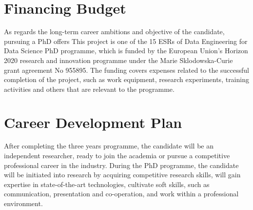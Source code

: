 \documentclass[12pt]{article}
\begin{document}
\section{Financing Budget}
As regards the long-term career ambitions and objective of the candidate, pursuing a PhD offers 
This project is one of the 15 ESRs of Data Engineering for Data Science PhD programme, which is funded by the European Union's Horizon 2020 research and innovation programme under the Marie Sklodowska-Curie grant agreement No 955895. The funding covers expenses related to the successful completion of the project, such as work equipment, research experiments, training activities and others
that are relevant to the programme.



\section{Career Development Plan}
After completing the three years 
programme, the candidate will be an independent researcher, ready to join the academia or pursue a competitive professional career in the industry. 
During the PhD programme, the candidate will be initiated 
into research by acquiring competitive research skills, will gain expertise in state-of-the-art technologies, 
cultivate soft skills, such as communication, presentation and co-operation, and work within a professional environment.


%
\printbibliography

\end{document}
